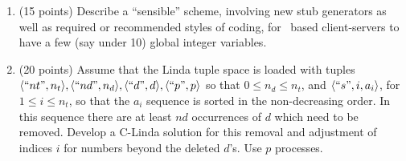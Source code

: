 \begin{enumerate}
\item (15 points)
Describe a ``sensible'' scheme, involving new stub generators as well
as required or recommended styles of coding, for \RPC\ based
client-servers to have a few (say under 10) global integer variables.

\item (20 points)
Assume that the Linda tuple space is loaded with tuples $\langle ``nt", n_t
\rangle, \langle ``nd", n_d \rangle, \langle ``d", d \rangle, \langle ``p", p \rangle$ so that $0 \le
n_d \le n_t$, and $\langle ``s", i, a_i \rangle$, for $1 \le i \le n_t$, so
that the $a_i$ sequence is sorted in the non-decreasing order.  In
this sequence there are at least $nd$ occurrences of $d$ which need to
be removed.  Develop a C-Linda solution for this removal and
adjustment of indices $i$ for numbers beyond the deleted $d$'s.  Use
$p$ processes.

\end{enumerate}


